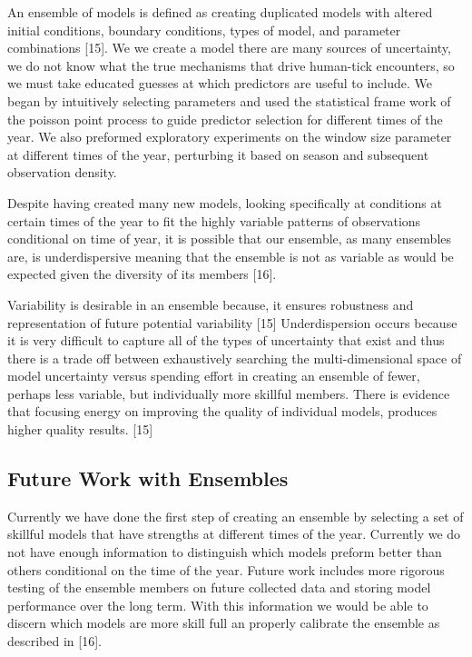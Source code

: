 \noindent An ensemble of models is defined as creating duplicated models with altered initial conditions, boundary conditions, types of model, and parameter combinations [15]. We we create a model there are many sources of uncertainty, we do not know what the true mechanisms that drive human-tick encounters, so we must take educated guesses at which predictors are useful to include. We began by intuitively selecting parameters and used the statistical frame work of the poisson point process to guide predictor selection for different times of the year.  We also preformed exploratory experiments on the window size parameter at different times of the year, perturbing it based on season and subsequent observation density.  \newline

\noindent Despite having created many new models, looking specifically at conditions at certain times of the year to fit the highly variable patterns of observations conditional on time of year, it is possible that our ensemble, as many ensembles are, is underdispersive meaning that the ensemble is not as variable as would be expected given the diversity of its members [16]. \newline

\noindent Variability is desirable in an ensemble because, it ensures robustness and representation of future potential variability [15] Underdispersion occurs because it is very difficult to capture all of the types of uncertainty that exist and thus there is a trade off between exhaustively searching the multi-dimensional space of model uncertainty versus spending effort in creating an ensemble of fewer, perhaps less variable, but individually more skillful members. There is evidence that focusing energy on improving the quality of individual models, produces higher quality results. [15]


\subsection{Future Work with Ensembles}
 
Currently we have done the first step of creating an ensemble by selecting a set of skillful models that have strengths at different times of the year. Currently we do not have enough information to distinguish which models preform better than others conditional on the time of the year. Future work includes more rigorous testing of the ensemble members on future collected data and storing model performance over the long term. With this information we would be able to discern which models are more skill full an properly calibrate the ensemble as described in [16]. 


